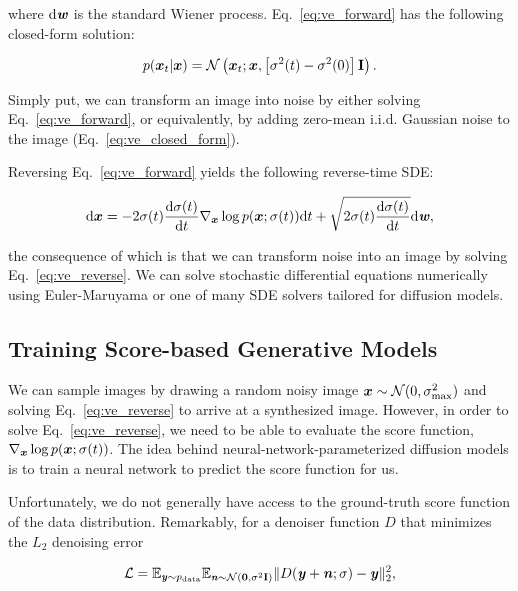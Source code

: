 where $\text{d}\textbf{\textit{w}}$ is the standard Wiener process. Eq.~\ref{eq:ve_forward} has the following closed-form solution:

\begin{equation}
    p(\boldsymbol{x}_t |\boldsymbol{x}) = \mathcal{N}\left( \boldsymbol{x}_t; \boldsymbol{x}, \left[ \sigma^2 (t) - \sigma^2 (0) \right] \mathbf{I} \right). \label{eq:ve_closed_form}
\end{equation}

Simply put, we can transform an image into noise by either solving Eq.~\ref{eq:ve_forward}, or equivalently, by adding zero-mean i.i.d. Gaussian noise to the image (Eq.~\ref{eq:ve_closed_form}).

Reversing Eq.~\ref{eq:ve_forward} yields the following reverse-time SDE:

\begin{equation}
    \text{d}\boldsymbol{x} = - 2 \sigma(t) \frac{\text{d}\sigma (t)}{\text{d}t} \nabla_{\boldsymbol{x}} \log p(\boldsymbol{x}; \sigma(t)) \text{d} t + \sqrt{2 \sigma(t) \frac{\text{d} \sigma (t)}{\text{d} t}} \text{d} \textbf{\textit{w}}, \label{eq:ve_reverse}
\end{equation}

the consequence of which is that we can transform noise into an image by solving Eq.~\ref{eq:ve_reverse}. We can solve stochastic differential equations numerically using Euler-Maruyama or one of many SDE solvers tailored for diffusion models.

\subsection{Training Score-based Generative Models}

We can sample images by drawing a random noisy image $\boldsymbol{x} \sim \mathcal{N}(0, \sigma_{\text{max}}^2)$ and solving Eq.~\ref{eq:ve_reverse} to arrive at a synthesized image. However, in order to solve Eq.~\ref{eq:ve_reverse}, we need to be able to evaluate the score function, $\nabla_{\boldsymbol{x}} \log p(\boldsymbol{x}; \sigma(t))$. The idea behind neural-network-parameterized diffusion models is to train a neural network to predict the score function for us.

Unfortunately, we do not generally have access to the ground-truth score function of the data distribution. Remarkably, for a denoiser function $D$ that minimizes the $L_2$ denoising error 

\begin{equation}
    \mathcal{L} = \mathbb{E}_{\textbf{\textit{y}}\sim p_\text{data}} \mathbb{E}_{\textbf{\textit{n}} \sim \mathcal{N}(\mathbf{0}, \sigma^2 \mathbf{I})}\|D(\textbf{\textit{y}}+\textbf{\textit{n}}; \sigma) - \textbf{\textit{y}}\|^2_2, \label{eq:loss}
\end{equation}
    
